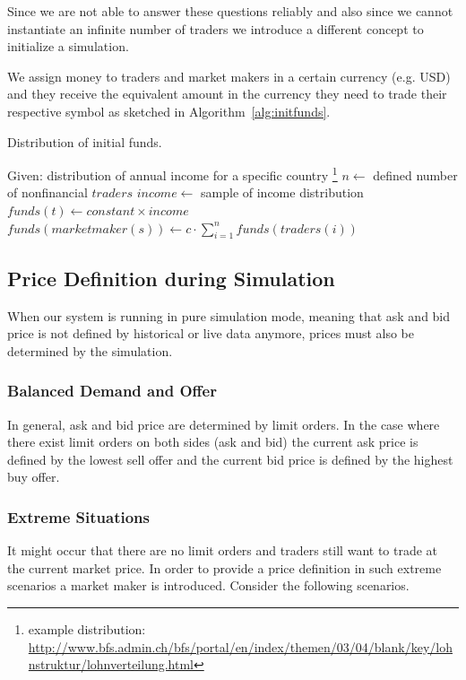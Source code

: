 Since we are not able to answer these questions reliably and also since we cannot
instantiate an infinite number of traders we introduce a different concept to
initialize a simulation.

We assign money to traders and market makers in a certain currency (e.g. USD) and
they receive the equivalent amount in the currency they need to trade their respective
symbol as sketched in Algorithm~\ref{alg:initfunds}.

\begin{algorithm}
\caption{Distribution of initial funds.}
\label{alg:initfunds}
\begin{algorithmic}[1]
  \Statex Given: distribution of annual income for a specific country
  \footnote{example distribution: \url{http://www.bfs.admin.ch/bfs/portal/en/index/themen/03/04/blank/key/lohnstruktur/lohnverteilung.html}}
  \Statex
    \State  $n \gets$ defined number of nonfinancial $traders$
      \State $income \gets$ sample of income distribution
      \State $funds(t) \gets constant \times income$
    \EndFor
    \State $funds(marketmaker(s)) \gets c \cdot \sum_{i=1}^n funds(traders(i))$
  \EndFor
\end{algorithmic}
\end{algorithm}

\subsection{Price Definition during Simulation}

When our system is running in pure simulation mode, meaning that ask and bid price is
not defined by historical or live data anymore, prices must also be determined by the
simulation.

\subsubsection{Balanced Demand and Offer}
In general, ask and bid price are determined by limit orders. In the case where there
exist limit orders on both sides (ask and bid) the current ask price is defined by the
lowest sell offer and the current bid price is defined by the highest buy offer.

\subsubsection{Extreme Situations}
It might occur that there are no limit orders and traders still want to trade at the
current market price. In order to provide a price definition in such extreme scenarios
a market maker is introduced. Consider the following scenarios.

